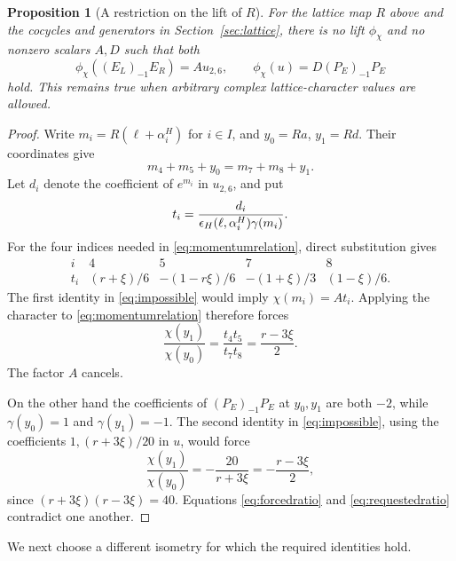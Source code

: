 \documentclass[11pt,reqno]{amsart}
\newtheorem{proposition}[theorem]{Proposition}
\theoremstyle{definition}\newtheorem{definition}[theorem]{Definition}
\theoremstyle{remark}\newtheorem{remark}[theorem]{Remark}
\numberwithin{equation}{section}
\begin{document}
\begin{proposition}[A restriction on the lift of $R$]\label{prop:obstruction}
For the lattice map $R$ above and the cocycles and generators in Section~\ref{sec:lattice}, there is no lift $\phi_\chi$ and no nonzero scalars $A,D$ such that both
\begin{equation}\label{eq:impossible}
 \phi_\chi((E_L)_{-1}E_R)=A u_{2,6},
 \qquad \phi_\chi(u)=D(P_E)_{-1}P_E
\end{equation}
hold. This remains true when arbitrary complex lattice-character values are allowed.
\end{proposition}
\begin{proof}
Write $m_i=R(\ell+\alpha_i^H)$ for $i\in I$, and $y_0=Ra$, $y_1=Rd$. Their coordinates give
\begin{equation}\label{eq:momentumrelation}
 m_4+m_5+y_0=m_7+m_8+y_1.
\end{equation}
Let $d_i$ denote the coefficient of $e^{m_i}$ in $u_{2,6}$, and put
\[
 t_i=\frac{d_i}{\epsilon_H(\ell,\alpha_i^H)\gamma(m_i)}.
\]
For the four indices needed in \eqref{eq:momentumrelation}, direct substitution gives
\begin{equation}\label{eq:ti}
 \begin{array}{c|cccc}
 i&4&5&7&8\\\hline
 t_i&(r+\xi )/6&-(1-r\xi )/6&-(1+\xi )/3&(1-\xi )/6.
 \end{array}
\end{equation}
The first identity in \eqref{eq:impossible} would imply $\chi(m_i)=At_i$. Applying the character to \eqref{eq:momentumrelation} therefore forces
\begin{equation}\label{eq:forcedratio}
 \frac{\chi(y_1)}{\chi(y_0)}
 =\frac{t_4t_5}{t_7t_8}=\frac{r-3\xi }{2}.
\end{equation}
The factor $A$ cancels.

On the other hand the coefficients of $(P_E)_{-1}P_E$ at $y_0,y_1$ are both $-2$, while $\gamma(y_0)=1$ and $\gamma(y_1)=-1$. The second identity in \eqref{eq:impossible}, using the coefficients $1,(r+3\xi )/20$ in $u$, would force
\begin{equation}\label{eq:requestedratio}
 \frac{\chi(y_1)}{\chi(y_0)}
 =-\frac{20}{r+3\xi }=-\frac{r-3\xi }{2},
\end{equation}
since $(r+3\xi )(r-3\xi )=40$. Equations \eqref{eq:forcedratio} and \eqref{eq:requestedratio} contradict one another.
\end{proof}

We next choose a different isometry for which the required identities hold.
\end{document}

